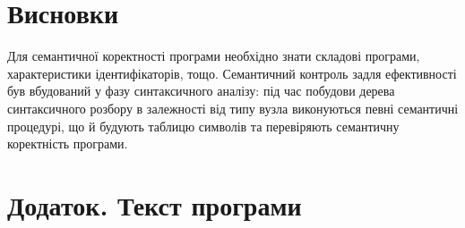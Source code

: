\documentclass[a4paper,12pt,notitlepage,pdftex]{scrreprt}
\begin{document}
\chapter{Висновки}
\label{chap:concl}
    Для семантичної коректності програми необхідно знати складові програми, характеристики ідентифікаторів, тощо.
    Семантичний контроль задля ефективності був вбудований у фазу синтаксичного аналізу: під час побудови дерева
    синтаксичного розбору в залежності від типу вузла виконуються певні семантичні процедурі, що й будують таблицю
    символів та перевіряють семантичну коректність програми.
\chapter*{Додаток. Текст програми}
    \lstset{language=C++,basicstyle=\scriptsize}
        
\end{document}
